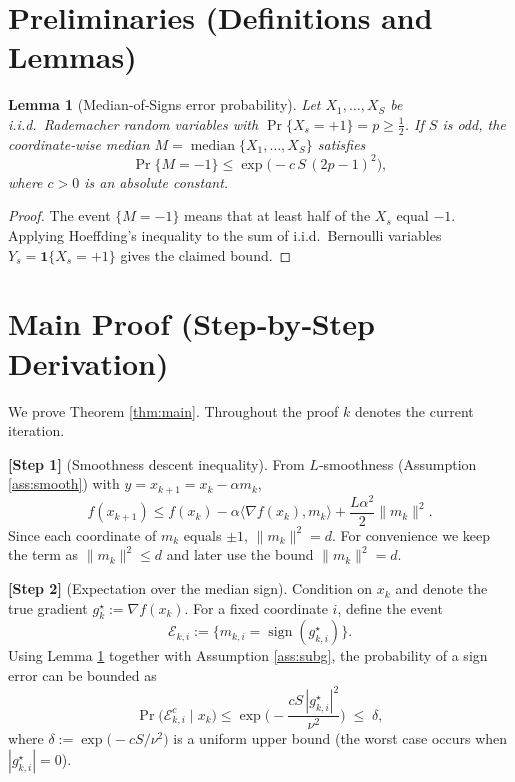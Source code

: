 \documentclass[11pt]{article}
\newcommand{\sign}{\operatorname{sign}}
\newtheorem{lemma}{Lemma}
\begin{document}
\section*{Preliminaries (Definitions and Lemmas)}
\begin{lemma}[Median‑of‑Signs error probability]\label{lem:median}
Let $X_{1},\dots,X_{S}$ be i.i.d.\ Rademacher random variables with 
$\Pr\{X_{s}=+1\}=p\ge\frac12$. If $S$ is odd, the coordinate‑wise median $M=\operatorname{median}\{X_{1},\dots,X_{S}\}$ satisfies
\[
    \Pr\{M=-1\}\le \exp\!\big(-c\,S\,(2p-1)^{2}\big),
\]
where $c>0$ is an absolute constant.
\end{lemma}
\begin{proof}
The event $\{M=-1\}$ means that at least half of the $X_{s}$ equal $-1$.
Applying Hoeffding’s inequality to the sum of i.i.d.\ Bernoulli variables
$Y_{s}=\mathbf{1}\{X_{s}=+1\}$ gives the claimed bound.
\end{proof}

\section*{Main Proof (Step‑by‑Step Derivation)}
We prove Theorem \ref{thm:main}. Throughout the proof $k$ denotes the current iteration.

\noindent\textbf{[Step 1]} (Smoothness descent inequality).  
From $L$‑smoothness (Assumption \ref{ass:smooth}) with $y=x_{k+1}=x_{k}-\alpha m_{k}$,
\[
    f(x_{k+1})\le f(x_{k})-\alpha\langle\nabla f(x_{k}),m_{k}\rangle
    +\frac{L\alpha^{2}}{2}\|m_{k}\|^{2}.
\tag{2}
\]
Since each coordinate of $m_{k}$ equals $\pm1$, $\|m_{k}\|^{2}=d$. For convenience we keep the term as $\|m_{k}\|^{2}\le d$ and later use the bound $\|m_{k}\|^{2}=d$.

\noindent\textbf{[Step 2]} (Expectation over the median sign).  
Condition on $x_{k}$ and denote the true gradient $g^{\star}_{k}:=\nabla f(x_{k})$.  
For a fixed coordinate $i$, define the event 
\[
    \mathcal{E}_{k,i}:=\big\{m_{k,i}= \sign(g^{\star}_{k,i})\big\}.
\]
Using Lemma \ref{lem:median} together with Assumption \ref{ass:subg},
the probability of a sign error can be bounded as
\[
    \Pr\big(\mathcal{E}_{k,i}^{c}\mid x_{k}\big)\le 
    \exp\!\Big(-\frac{cS\,|g^{\star}_{k,i}|^{2}}{\nu^{2}}\Big)
    \;\le\; \delta ,
\tag{3}
\]
where $\delta:=\exp\!\big(-c S/\nu^{2}\big)$ is a uniform upper bound (the worst case occurs when $|g^{\star}_{k,i}|=0$).  
\end{document}
